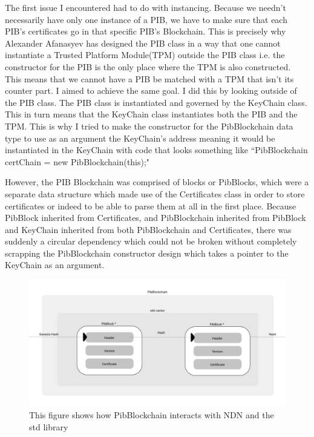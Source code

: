 The first issue I encountered had to do with instancing. Because we needn't necessarily have only one instance of a PIB, we have to make sure that each PIB's certificates go in that specific PIB's Blockchain. This is precisely why Alexander Afanasyev has designed the PIB class in a way that one cannot instantiate a Trusted Platform Module(TPM) outside the PIB class i.e. the constructor for the PIB is the only place where the TPM is also constructed. This means that we cannot have a PIB be matched with a TPM that isn't its counter part. I aimed to achieve the same goal. I did this by looking outside of the PIB class. The PIB class is instantiated and governed by the KeyChain class. This in turn means that the KeyChain class instantiates both the PIB and the TPM. This is why I tried to make the constructor for the PibBlockchain data type to use as an argument the KeyChain's address meaning it would be instantiated in the KeyChain with code that looks something like ``PibBlockchain certChain = new PibBlockchain(this);"

However, the PIB Blockchain was comprised of blocks or PibBlocks, which were a separate data structure which made use of the Certificates class in order to store certificates or indeed to be able to parse them at all in the first place. Because PibBlock inherited from Certificates, and PibBlockchain inherited from PibBlock and KeyChain inherited from both PibBlockchain and Certificates, there was suddenly a circular dependency which could not be broken without completely scrapping the PibBlockchain constructor design which takes a pointer to the KeyChain as an argument. 

\begin{figure}
\includegraphics[width=6in]{pibblockchain.png}
\caption{This figure shows how PibBlockchain interacts with NDN and the std library}
\end{figure}

